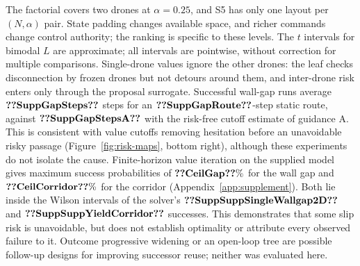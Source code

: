 The factorial covers two drones at $\alpha=0.25$, and S5 has only one layout
per $(N,\alpha)$ pair. State padding changes available space, and richer
commands change control authority; the ranking is specific to these levels.
The $t$ intervals for bimodal $L$ are approximate; all intervals are
pointwise, without correction for multiple comparisons.
Single-drone values ignore the other drones: the leaf checks disconnection
by frozen drones but not detours around them, and inter-drone risk enters only
through the proposal surrogate. Successful wall-gap runs average
$\val{SuppGapSteps}$ steps for an $\val{SuppGapRoute}$-step static route, against
$\val{SuppGapStepsA}$ with the risk-free cutoff estimate of guidance A. This is
consistent with value cutoffs removing hesitation before an unavoidable risky
passage (Figure~\ref{fig:risk-maps}, bottom right), although these
experiments do not isolate the cause.
Finite-horizon value iteration on the supplied model gives maximum success
probabilities of
$\val{CeilGap}\%$ for the wall gap and $\val{CeilCorridor}\%$ for the corridor
(Appendix~\ref{app:supplement}). Both lie inside the Wilson intervals of the
solver's $\val{SuppSuppSingleWallgap2D}$ and $\val{SuppSuppYieldCorridor}$
successes. This demonstrates that some slip risk is unavoidable,
but does not establish optimality or attribute every observed failure to it.
Outcome progressive widening or an open-loop tree are possible follow-up
designs for improving successor reuse; neither was evaluated here.
